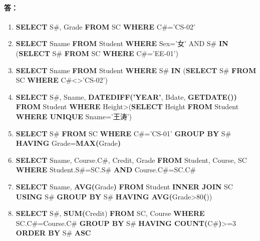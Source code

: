 \paragraph{答：}
\begin{enumerate}
	\item \textbf{SELECT} S\#, Grade \textbf{FROM} SC \textbf{WHERE} C\#='CS-02'

	\item \textbf{SELECT} Sname \textbf{FROM} Student \textbf{WHERE} Sex='女' AND S\# \textbf{IN} (\textbf{SELECT} S\# \textbf{FROM} SC \textbf{WHERE} C\#='EE-01')
	
	\item \textbf{SELECT} Sname \textbf{FROM} Student \textbf{WHERE} S\# \textbf{IN} (\textbf{SELECT} S\# \textbf{FROM} SC \textbf{WHERE} C\#<>'CS-02')
	
	\item \textbf{SELECT} S\#, Sname, \textbf{DATEDIFF('YEAR'}, Bdate, \textbf{GETDATE())} \textbf{FROM} Student \textbf{WHERE } Height>(\textbf{SELECT} Height \textbf{FROM} Student \textbf{WHERE UNIQUE} Sname='王涛') 
	
	\item \textbf{SELECT} S\# \textbf{FROM} SC \textbf{WHERE} C\#='CS-01' \textbf{GROUP BY} S\# \textbf{HAVING} Grade=\textbf{MAX(}Grade\textbf{)}
	
	\item \textbf{SELECT} Sname, Course.C\#, Credit, Grade \textbf{FROM} Student, Course, SC \textbf{WHERE} Student.S\#=SC.S\# \textbf{AND} Course.C\#=SC.C\#
	
	\item \textbf{SELECT} Sname, \textbf{AVG(}Grade\textbf{)} \textbf{FROM} Student \textbf{INNER JOIN} SC \textbf{USING} S\# \textbf{GROUP BY} S\# \textbf{HAVING AVG(}Grade>80\textbf())
	
	\item \textbf{SELECT} S\#, \textbf{SUM(}Credit) \textbf{FROM} SC, Course \textbf{WHERE} SC.C\#=Course.C\# \textbf{GROUP BY} S\# \textbf{HAVING COUNT(}C\#\textbf{)}>=3 \textbf{ORDER BY} S\# \textbf{ASC} 
\end{enumerate}